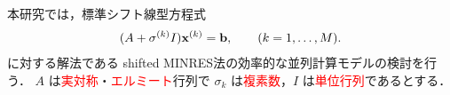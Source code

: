 

本研究では，標準シフト線型方程式
\begin{align}
	(A + \sigma^{(k)}I)\vb{x}^{(k)} = \vb{b}, \qquad (k=1,\dots,M).
	\label{eq-std-sls}
\end{align}
に対する解法である shifted MINRES法\cite{ref-S-HIDAKA-2025}の効率的な並列計算モデルの検討を行う．
$A$ は\textcolor{red}{実対称}・\textcolor{red}{エルミート}行列で $\sigma_{k}$ は\textcolor{red}{複素数}，$I$ は\textcolor{red}{単位行列}であるとする．
